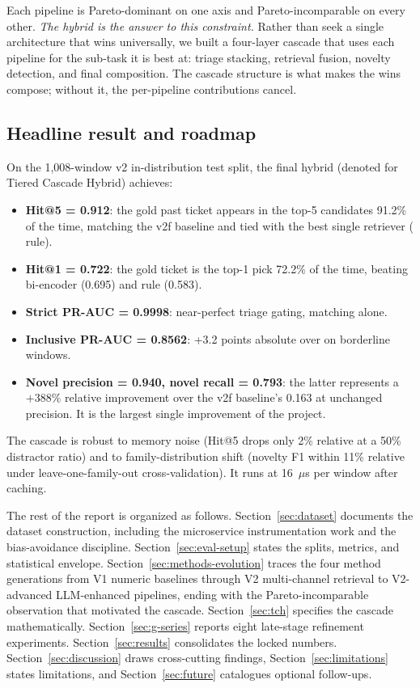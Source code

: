 Each pipeline is Pareto-dominant on one axis and Pareto-incomparable on every other. \emph{The hybrid is the answer to this constraint.} Rather than seek a single architecture that wins universally, we built a four-layer cascade that uses each pipeline for the sub-task it is best at: triage stacking, retrieval fusion, novelty detection, and final composition. The cascade structure is what makes the wins compose; without it, the per-pipeline contributions cancel.

\subsection{Headline result and roadmap}

On the 1{,}008-window v2 in-distribution test split, the final hybrid (denoted \tch{} for Tiered Cascade Hybrid) achieves:

\begin{itemize}
\item \textbf{Hit@5 = 0.912}: the gold past ticket appears in the top-5 candidates 91.2\% of the time, matching the v2f baseline and tied with the best single retriever (\hrrf{} rule).
\item \textbf{Hit@1 = 0.722}: the gold ticket is the top-1 pick 72.2\% of the time, beating bi-encoder (0.695) and \hrrf{} rule (0.583).
\item \textbf{Strict PR-AUC = 0.9998}: near-perfect triage gating, matching \hgb{} alone.
\item \textbf{Inclusive PR-AUC = 0.8562}: +3.2 points absolute over \hgb{} on borderline windows.
\item \textbf{Novel precision = 0.940, novel recall = 0.793}: the latter represents a $+388\%$ relative improvement over the v2f baseline's 0.163 at unchanged precision. It is the largest single improvement of the project.
\end{itemize}

The cascade is robust to memory noise (Hit@5 drops only 2\% relative at a 50\% distractor ratio) and to family-distribution shift (novelty F1 within 11\% relative under leave-one-family-out cross-validation). It runs at 16~$\mu$s per window after caching.

The rest of the report is organized as follows. Section~\ref{sec:dataset} documents the dataset construction, including the microservice instrumentation work and the bias-avoidance discipline. Section~\ref{sec:eval-setup} states the splits, metrics, and statistical envelope. Section~\ref{sec:methods-evolution} traces the four method generations from V1 numeric baselines through V2 multi-channel retrieval to V2-advanced LLM-enhanced pipelines, ending with the Pareto-incomparable observation that motivated the cascade. Section~\ref{sec:tch} specifies the \tch{} cascade mathematically. Section~\ref{sec:g-series} reports eight late-stage refinement experiments. Section~\ref{sec:results} consolidates the locked numbers. Section~\ref{sec:discussion} draws cross-cutting findings, Section~\ref{sec:limitations} states limitations, and Section~\ref{sec:future} catalogues optional follow-ups.

